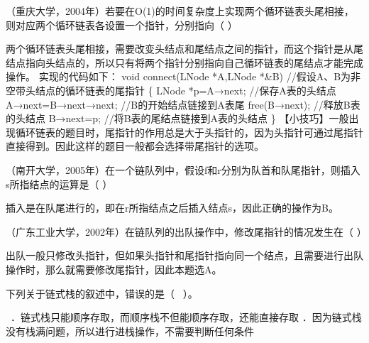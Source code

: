 \question （重庆大学，2004年）若要在O(1)的时间复杂度上实现两个循环链表头尾相接，则对应两个循环链表各设置一个指针，分别指向（
）
\par{}
\begin{solution}两个循环链表头尾相接，需要改变头结点和尾结点之间的指针，而这个指针是从尾结点指向头结点的，所以只有将两个指针分别指向自己循环链表的尾结点才能完成操作。
实现的代码如下： void connect(LNode *A,LNode *\&B)
//假设A、B为非空带头结点的循环链表的尾指针 \{ LNode *p=A→next;
//保存A表的头结点 A→next=B→next→next; //B的开始结点链接到A表尾
free(B→next); //释放B表的头结点 B→next=p;
//将B表的尾结点链接到A表的头结点 \}
【小技巧】一般出现循环链表的题目时，尾指针的作用总是大于头指针的，因为头指针可通过尾指针直接得到。因此这样的题目一般都会选择带尾指针的选项。
\end{solution}
\question （南开大学，2005年）在一个链队列中，假设f和r分别为队首和队尾指针，则插入s所指结点的运算是（
）
\par{}
\begin{solution}插入是在队尾进行的，即在r所指结点之后插入结点s，因此正确的操作为B。
\end{solution}
\question （广东工业大学，2002年）在链队列的出队操作中，修改尾指针的情况发生在（
）
\par{}
\begin{solution}出队一般只修改头指针，但如果头指针和尾指针指向同一个结点，且需要进行出队操作时，那么就需要修改尾指针，因此本题选A。
\end{solution}
\question 下列关于链式栈的叙述中，错误的是（ ~）。

~．链式栈只能顺序存取，而顺序栈不但能顺序存取，还能直接存取
．因为链式栈没有栈满问题，所以进行进栈操作，不需要判断任何条件

